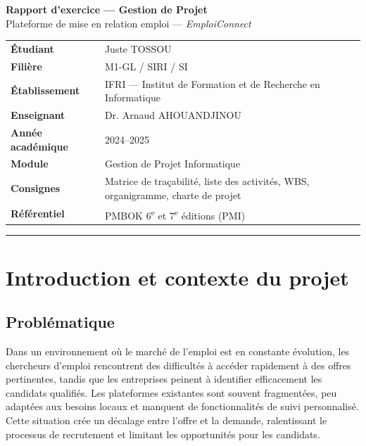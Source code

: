 \documentclass[11pt,a4paper]{article}
\newcommand{\metarow}[2]{#1 & #2 \\}
\begin{document}
\begin{center}
    \colorbox{ifriblue}{\parbox{\dimexpr\textwidth-2\fboxsep}{
        \centering
        \color{white}
        \vspace{0.6em}
        {\LARGE \textbf{Rapport d'exercice --- Gestion de Projet}}\\[0.4em]
        {\large Plateforme de mise en relation emploi --- \textit{EmploiConnect}}
        \vspace{0.6em}
    }}
\end{center}

\vspace{0.8em}

\noindent
\begin{tabularx}{\textwidth}{|>{\bfseries}l|X|}
    \hline
    \rowcolor{ifrigray}
    \metarow{Étudiant}{Juste TOSSOU}
    \metarow{Filière}{M1-GL / SIRI / SI}
    \metarow{Établissement}{IFRI --- Institut de Formation et de Recherche en Informatique}
    \metarow{Enseignant}{Dr. Arnaud AHOUANDJINOU}
    \metarow{Année académique}{2024--2025}
    \metarow{Module}{Gestion de Projet Informatique}
    \metarow{Consignes}{Matrice de traçabilité, liste des activités, WBS, organigramme, charte de projet}
    \metarow{Référentiel}{PMBOK\textsuperscript{\textregistered} 6\textsuperscript{e} et 7\textsuperscript{e} éditions (PMI)}
    \hline
\end{tabularx}

\vspace{0.8em}
\hrule
\vspace{0.6em}

\section{Introduction et contexte du projet}

\subsection{Problématique}

Dans un environnement où le marché de l'emploi est en constante évolution, les chercheurs d'emploi rencontrent des difficultés à accéder rapidement à des offres pertinentes, tandis que les entreprises peinent à identifier efficacement les candidats qualifiés. Les plateformes existantes sont souvent fragmentées, peu adaptées aux besoins locaux et manquent de fonctionnalités de suivi personnalisé. Cette situation crée un décalage entre l'offre et la demande, ralentissant le processus de recrutement et limitant les opportunités pour les candidats.
\end{document}
